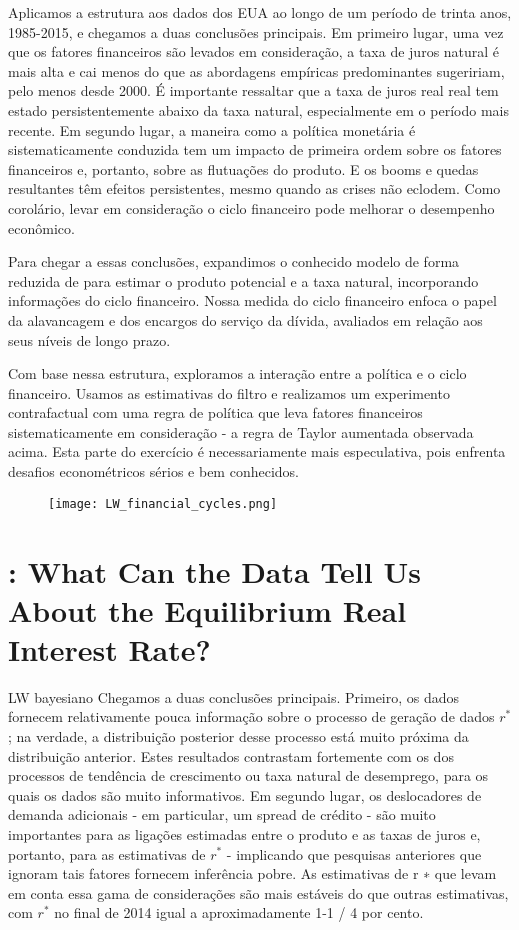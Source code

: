 Aplicamos a estrutura aos dados dos EUA ao longo de um período de trinta anos, 1985-2015, e chegamos a duas conclusões principais. Em primeiro lugar, uma vez que os fatores financeiros são levados em consideração, a taxa de juros natural é mais alta e cai menos do que as abordagens empíricas predominantes sugeririam, pelo menos desde 2000. É importante ressaltar que a taxa de juros real real tem estado persistentemente abaixo da taxa natural, especialmente em o período mais recente. Em segundo lugar, a maneira como a política monetária é sistematicamente conduzida tem um impacto de primeira ordem sobre os fatores financeiros e, portanto, sobre as flutuações do produto. E os booms e quedas resultantes têm efeitos persistentes, mesmo quando as crises não eclodem. Como corolário, levar em consideração o ciclo financeiro pode melhorar o desempenho econômico.

Para chegar a essas conclusões, expandimos o conhecido modelo de forma reduzida de \citet{LW:2003} para estimar o produto potencial e a taxa natural, incorporando informações do ciclo financeiro. Nossa medida do ciclo financeiro enfoca o papel da alavancagem e dos encargos do serviço da dívida, avaliados em relação aos seus níveis de longo prazo.

Com base nessa estrutura, exploramos a interação entre a política e o ciclo financeiro. Usamos as estimativas do filtro e realizamos um experimento contrafactual com uma regra de política que leva fatores financeiros sistematicamente em consideração - a regra de Taylor aumentada observada acima. Esta parte do exercício é necessariamente mais especulativa, pois enfrenta desafios econométricos sérios e bem conhecidos.

\begin{figure}[H]
\centering
\texttt{[image: LW\_financial\_cycles.png]}
\end{figure}
%
%
\section{\citet{Kiley:2015}: What Can the Data Tell Us About the Equilibrium Real Interest Rate?}
LW bayesiano
Chegamos a duas conclusões principais. Primeiro, os dados fornecem relativamente pouca informação sobre o processo de geração de dados $r^{*}$; na verdade, a distribuição posterior desse processo está muito próxima da distribuição anterior. Estes resultados contrastam fortemente com os dos processos de tendência de crescimento ou taxa natural de desemprego, para os quais os dados são muito informativos. Em segundo lugar, os deslocadores de demanda adicionais - em particular, um spread de crédito - são muito importantes para as ligações estimadas entre o produto e as taxas de juros e, portanto, para as estimativas de $r^{*}$ - implicando que pesquisas anteriores que ignoram tais fatores fornecem inferência pobre. As estimativas de r ∗ que levam em conta essa gama de considerações são mais estáveis do que outras estimativas, com $r^{*}$ no final de 2014 igual a aproximadamente 1-1 / 4 por cento.
%
%
